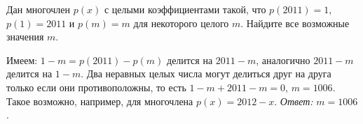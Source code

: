 Дан многочлен $p(x)$ с целыми коэффициентами такой, что
$p(2011) = 1$, $p(1) = 2011$ и $p(m) = m$ для некоторого целого $m$.
Найдите все возможные значения $m$.


\solution
Имеем: $1 - m = p(2011) - p(m)$ делится на $2011 - m$, аналогично $2011 - m$
делится на $1 - m$.
Два неравных целых числа могут делиться друг на друга только если они
противоположны, то есть $1 - m + 2011 - m = 0$, $m = 1006$.
Такое возможно, например, для многочлена $p(x) = 2012 - x$.
\emph{Ответ:}
$m = 1006$.

